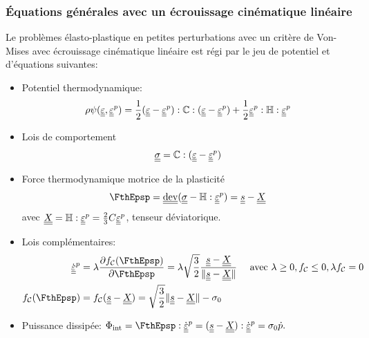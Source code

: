 \documentclass[10pt]{book}
\begin{document}
\begin{appendices}
\subsubsection{Équations générales avec un écrouissage cinématique linéaire}
Le problèmes élasto-plastique en petites perturbations avec un critère de Von-Mises avec écrouissage cinématique linéaire est régi par le jeu de potentiel et d'équations suivantes:
\begin{itemize}
\item Potentiel thermodynamique:
$$\rho \psi(\underline{\underline{\varepsilon}},\underline{\underline{\varepsilon}}^p)=\frac{1}{2}(\underline{\underline{\varepsilon}}-\underline{\underline{\varepsilon}}^p):\mathbb{C}:(\underline{\underline{\varepsilon}}-\underline{\underline{\varepsilon}}^p)+\frac{1}{2}\underline{\underline{\varepsilon}}^p:\mathbb{H}:\underline{\underline{\varepsilon}}^p$$
\item Lois de comportement
$$\underline{\underline{\sigma}} =\mathbb{C}:(\underline{\underline{\varepsilon}}-\underline{\underline{\varepsilon}}^p)$$
\item Force thermodynamique motrice de la plasticité
$$\FthEpsp=\dev(\SC-\TenEcroui:\EpsP)=\devia-\TenTranslatDom$$
avec $\underline{\underline{X}}=\mathbb{H}:\underline{\underline{\varepsilon}}^p=\frac{2}{3}C\underline{\underline{\varepsilon}}^p$, tenseur déviatorique.
\item Lois complémentaires:
$$\begin{aligned}
\dot{\DefoHPP}^{p}&=\lambda\frac{\partial \FChargeConvexe(\FthEpsp)}{\partial \FthEpsp}=\lambda\sqrt{\frac{3}{2}}\frac{\devia-\TenTranslatDom}{\Vert \devia-\TenTranslatDom\Vert} \quad \avec \lambda\geq 0, \FChargeConvexe\leq 0, \lambda\FChargeConvexe=0\\
\FChargeConvexe(\FthEpsp)&=\FChargeConvexe(\devia-\TenTranslatDom)=\sqrt{\frac{3}{2}}\Vert \devia-\TenTranslatDom\Vert-\sigma_{0}
\end{aligned}$$
\item Puissance dissipée: $\dint=\FthEpsp:\dot{\DefoHPP}^{p}=(\devia-\TenTranslatDom):\dot{\DefoHPP}^{p}= \sigma_{0}\dot{p}.$
\end{itemize}

\end{appendices}
\end{document}
